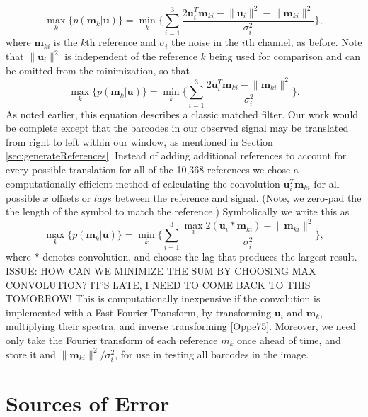 \begin{equation}
\max_k   \big\{  p(\mathbf{m}_k|\mathbf{u}) \big\} =  \min_k  \Bigg\{ \sum_{i=1}^3  \frac{  2 \mathbf{u}_i ^T \mathbf{m}_{ki} - \lVert \mathbf{u}_i \rVert^2  - \lVert \mathbf{m}_{ki} \rVert^2   }{\sigma_i^2}  \Bigg\}, 
\end{equation}
where $\mathbf{m}_{ki}$  is the $k$th reference and $\sigma_i$ the noise in the $i$th channel, as before. Note that $\lVert \mathbf{u}_i \rVert^2$  is independent of the reference $k$ being used for comparison and can be omitted from the minimization, so that
\begin{equation}
\max_k   \big\{  p(\mathbf{m}_k|\mathbf{u}) \big\} =  \min_k  \Bigg\{ \sum_{i=1}^3  \frac{  2 \mathbf{u}_i ^T \mathbf{m}_{ki}  - \lVert \mathbf{m}_{ki} \rVert^2   }{\sigma_i^2}  \Bigg\}. 
\end{equation}
As noted earlier, this equation describes a classic matched filter.
Our work would be complete except that the barcodes in our observed signal may be translated from right to left within our window, as mentioned in  Section \ref{sec:generateReferences}. Instead of adding  additional references to account for every possible translation for all of the 10,368 references we chose a computationally efficient method of calculating the convolution $\mathbf{u}_i ^T \mathbf{m}_{ki}$ for all possible $x$ offsets or $lags$ between the reference and signal. (Note, we zero-pad the the length of the symbol to match the reference.)  Symbolically we write this as 
\begin{equation}
\max_k   \big\{  p(\mathbf{m}_k|\mathbf{u}) \big\} =  \min_k  \Bigg\{ \sum_{i=1}^3 \frac{  \max_{x} 2 (\mathbf{u}_i * \mathbf{m}_{ki}) - \lVert \mathbf{m}_{ki} \rVert^2   }{\sigma_i^2}  
\Bigg\},
\end{equation}
where $*$ denotes convolution, and choose the lag that produces the largest result. ISSUE: HOW CAN WE MINIMIZE THE SUM BY CHOOSING MAX CONVOLUTION? IT'S LATE, I NEED TO COME BACK TO THIS TOMORROW! This is computationally inexpensive if the convolution is implemented with a Fast Fourier Transform, by transforming $\mathbf{u}_i$ and $\mathbf{m}_k$, multiplying their spectra, and inverse transforming [Oppe75]. Moreover,  we need only take the  Fourier transform of each reference $m_k$ once ahead of time, and store it and $\lVert \mathbf{m}_{ki} \rVert^2 / \sigma_i^2$, for use in testing all barcodes in the image.  


\section{Sources of Error}

